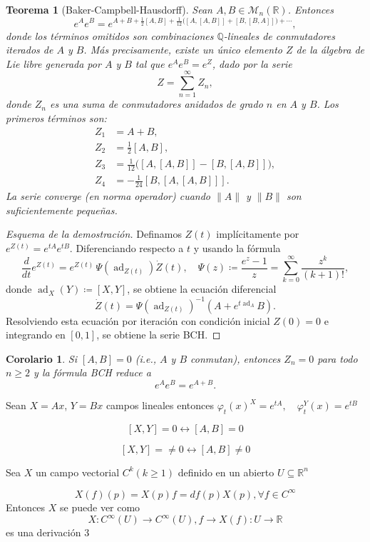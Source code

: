 \documentclass[11pt,a4paper]{article}
\theoremstyle{definition}
\theoremstyle{plain}
\newtheorem{teorema}{Teorema}[section]
\newtheorem{corolario}{Corolario}[section]
\theoremstyle{remark}
\newcommand{\R}{\mathbb R}
\begin{document}
	\begin{teorema}[Baker-Campbell-Hausdorff]
		Sean $A, B \in \mathcal{M}_n(\mathbb{R})$. Entonces
		\[
			e^A e^B = e^{A + B + \frac{1}{2}[A,B] + \frac{1}{12}\bigl([A,[A,B]] + [B,[B,A]]\bigr) + \cdots},
		\]
		donde los términos omitidos son combinaciones $\mathbb{Q}$-lineales de conmutadores iterados de $A$ y $B$. Más precisamente, existe un único elemento $Z$ de la álgebra de Lie libre generada por $A$ y $B$ tal que $e^A e^B = e^Z$, dado por la serie
		\[
			Z = \sum_{n=1}^{\infty} Z_n,
		\]
		donde $Z_n$ es una suma de conmutadores anidados de grado $n$ en $A$ y $B$. Los primeros términos son:
		\begin{align*}
			Z_1 &= A + B, \\
			Z_2 &= \frac{1}{2}[A,B], \\
			Z_3 &= \frac{1}{12}\bigl([A,[A,B]] - [B,[A,B]]\bigr), \\
			Z_4 &= -\frac{1}{24}[B,[A,[A,B]]].
		\end{align*}
		La serie converge (en norma operador) cuando $\|A\|$ y $\|B\|$ son suficientemente pequeñas.
	\end{teorema}

	\begin{proof}[Esquema de la demostración]
		Definamos $Z(t)$ implícitamente por $e^{Z(t)} = e^{tA}e^{tB}$. Diferenciando respecto a $t$ y usando la fórmula
		\[
			\frac{d}{dt}e^{Z(t)} = e^{Z(t)}\,\Psi\!\left(\operatorname{ad}_{Z(t)}\right)\!\dot{Z}(t), \quad \Psi(z) \coloneqq \frac{e^z - 1}{z} = \sum_{k=0}^{\infty}\frac{z^k}{(k+1)!},
		\]
		donde $\operatorname{ad}_X(Y) \coloneqq [X,Y]$, se obtiene la ecuación diferencial
		\[
			\dot{Z}(t) = \Psi\!\left(\operatorname{ad}_{Z(t)}\right)^{-1}(A + e^{t\operatorname{ad}_A}B).
		\]
		Resolviendo esta ecuación por iteración con condición inicial $Z(0) = 0$ e integrando en $[0,1]$, se obtiene la serie BCH.
	\end{proof}

	\begin{corolario}
		Si $[A,B] = 0$ (i.e., $A$ y $B$ conmutan), entonces $Z_n = 0$ para todo $n \geq 2$ y la fórmula BCH reduce a
		\[
			e^A e^B = e^{A+B}.
		\]
	\end{corolario}
	Sean $X=Ax$, $Y=Bx$ campos lineales entonces
	$\varphi_t(x)^X=e^{tA}, \quad \varphi_t^Y(x)=e^{tB}$
	
	$$[X,Y]=0\leftrightarrow [A,B]=0$$
	
	$$[X,Y]=\neq 0\leftrightarrow [A,B]\neq 0$$
	
	Sea $X$ un campo vectorial $C^k(k\geq 1)$ definido en un abierto $U\subseteq \R^n$
	
	$$X(f)(p)= X(p)f = df(p)X(p), \forall f\in C^\infty $$
	Entonces $X$ se puede ver como 
	$$X:C^\infty (U) \to C^\infty (U), f\to X(f):U \to \R$$
	es una derivación 3
\end{document}

